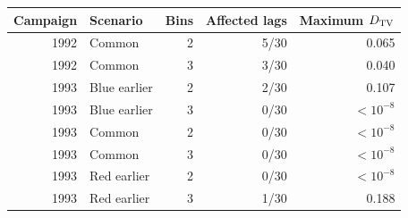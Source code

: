 \begin{tabular}{rlrrr}
\toprule
Campaign & Scenario & Bins & Affected lags & Maximum $D_{\rm TV}$ \\
\midrule
1992 & Common & 2 & 5/30 & 0.065 \\
1992 & Common & 3 & 3/30 & 0.040 \\
1993 & Blue earlier & 2 & 2/30 & 0.107 \\
1993 & Blue earlier & 3 & 0/30 & $<10^{-8}$ \\
1993 & Common & 2 & 0/30 & $<10^{-8}$ \\
1993 & Common & 3 & 0/30 & $<10^{-8}$ \\
1993 & Red earlier & 2 & 0/30 & $<10^{-8}$ \\
1993 & Red earlier & 3 & 1/30 & 0.188 \\
\bottomrule
\end{tabular}
